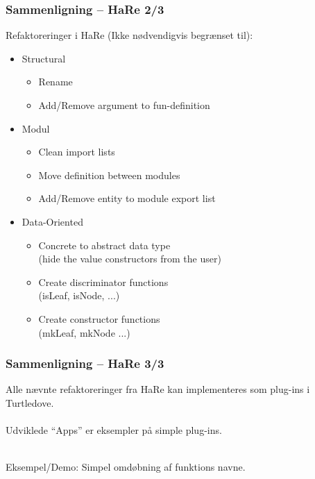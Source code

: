 \documentclass[slidestop,compress,mathserif, xcolor=dvipsnames]{beamer}
\begin{document}
\begin{frame}[c]
  \frametitle{Sammenligning -- HaRe 2/3}  

  Refaktoreringer i HaRe (Ikke nødvendigvis begrænset til):

  \begin{itemize}
  \item Structural
    \begin{itemize}
    \item Rename
    \item Add/Remove argument to fun-definition
    \end{itemize}

  \item Modul
    \begin{itemize}
    \item Clean import lists
    \item Move definition between modules
    \item Add/Remove entity to module export list
    \end{itemize}

  \item Data-Oriented
    \begin{itemize}
    \item Concrete to abstract data type \\ 
      {\footnotesize{(hide the value constructors from the user)}}
    \item Create discriminator functions \\
      {\footnotesize{(isLeaf, isNode, ...)}}
    \item Create constructor functions  \\
      {\footnotesize{(mkLeaf, mkNode ...)}}
    \end{itemize}                                                        
  \end{itemize}
\end{frame}


\begin{frame}[c]
  \frametitle{Sammenligning -- HaRe 3/3}  

  Alle nævnte refaktoreringer fra HaRe kan implementeres som plug-ins i
  Turtledove.
  \\ \ \\

  Udviklede "`Apps"' er eksempler på simple plug-ins. 
  \\ \ \\
  
  \begin{center}
    Eksempel/Demo: Simpel omdøbning af funktions navne.
  \end{center}
  
\end{frame}
\end{document}

